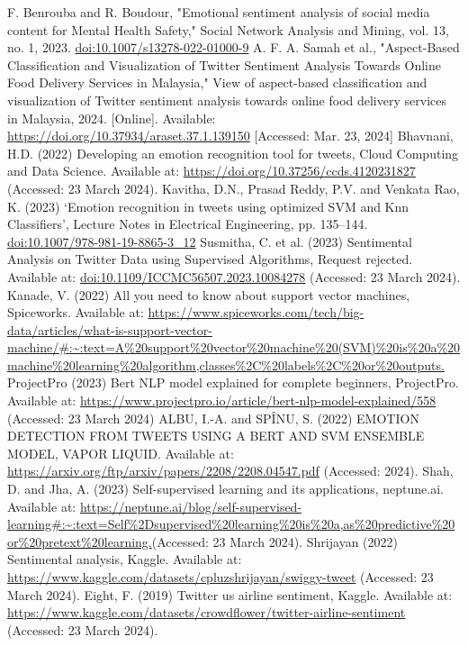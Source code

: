 \documentclass[conference]{IEEEtran}
\begin{document}
\begin{thebibliography}{00}
 F. Benrouba and R. Boudour, "Emotional sentiment analysis of social media content for Mental Health Safety," Social Network Analysis and Mining, vol. 13, no. 1, 2023. \url{doi:10.1007/s13278-022-01000-9}
 A. F. A. Samah et al., "Aspect-Based Classification and Visualization of Twitter Sentiment Analysis Towards Online Food Delivery Services in Malaysia," View of aspect-based classification and visualization of Twitter sentiment analysis towards online food delivery services in Malaysia, 2024. [Online]. Available: \url{https://doi.org/10.37934/araset.37.1.139150} [Accessed: Mar. 23, 2024]
 Bhavnani, H.D. (2022) Developing an emotion recognition tool for tweets, Cloud Computing and Data Science. Available at: \url{https://doi.org/10.37256/ccds.4120231827} (Accessed: 23 March 2024). 
 Kavitha, D.N., Prasad Reddy, P.V. and Venkata Rao, K. (2023) ‘Emotion recognition in tweets using optimized SVM and Knn Classifiers’, Lecture Notes in Electrical Engineering, pp. 135–144. \url{doi:10.1007/978-981-19-8865-3_12}
Susmitha, C. et al. (2023) Sentimental Analysis on Twitter Data using Supervised Algorithms, Request rejected. Available at: \url{doi:10.1109/ICCMC56507.2023.10084278} (Accessed: 23 March 2024).
 Kanade, V. (2022) All you need to know about support vector machines, Spiceworks. Available at: \url{https://www.spiceworks.com/tech/big-data/articles/what-is-support-vector-machine/#:~:text=A%20support%20vector%20machine%20(SVM)%20is%20a%20machine%20learning%20algorithm,classes%2C%20labels%2C%20or%20outputs.}
 ProjectPro (2023) Bert NLP model explained for complete beginners, ProjectPro. Available at: \url{https://www.projectpro.io/article/bert-nlp-model-explained/558} (Accessed: 23 March 2024)
 ALBU, I.-A. and SPÎNU, S. (2022) EMOTION DETECTION FROM TWEETS USING A BERT AND SVM ENSEMBLE MODEL, VAPOR LIQUID. Available at: \url{https://arxiv.org/ftp/arxiv/papers/2208/2208.04547.pdf} (Accessed: 2024). 
 Shah, D. and Jha, A. (2023) Self-supervised learning and its applications, neptune.ai. Available at: \url{https://neptune.ai/blog/self-supervised-learning#:~:text=Self%2Dsupervised%20learning%20is%20a,as%20predictive%20or%20pretext%20learning.}(Accessed: 23 March 2024). 
 Shrijayan (2022) Sentimental analysis, Kaggle. Available at: \url{ https://www.kaggle.com/datasets/cpluzshrijayan/swiggy-tweet} (Accessed: 23 March 2024).  
 Eight, F. (2019) Twitter us airline sentiment, Kaggle. Available at: \url{https://www.kaggle.com/datasets/crowdflower/twitter-airline-sentiment} (Accessed: 23 March 2024). 

\end{thebibliography}
\end{document}
